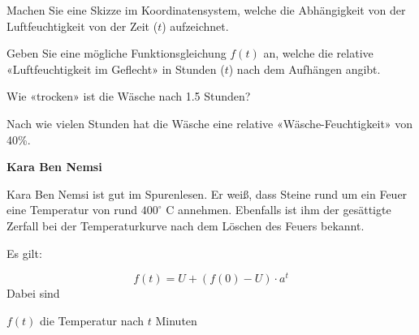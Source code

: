 \begin{bbwAufgabenBlock}
\item Machen Sie eine Skizze im Koordinatensystem, welche die
Abhängigkeit von der Luftfeuchtigkeit von der Zeit ($t$) aufzeichnet.


\item Geben Sie eine mögliche Funktionsgleichung $f(t)$ an, welche die relative
«Luftfeuchtigkeit im Geflecht» in Stunden ($t$) nach dem Aufhängen
angibt.


\item Wie «trocken» ist die Wäsche nach 1.5 Stunden?


\item Nach wie vielen Stunden hat die Wäsche eine relative
«Wäsche-Feuchtigkeit» von 40\%.


\TRAINER{

$$f(t) = 35 + 60 \cdot \left( \frac{19}{60}\right)^t$$
$f(t) = 40[\%]$ einsetzen:

$$40 [\%| = 35 + 60 \cdot \left( \frac{19}{60}\right)^t$$
$$5 [\%| = 60 \cdot \left( \frac{19}{60}\right)^t$$
$$\frac5{60} [\%| =\left( \frac{19}{60}\right)^t$$
$$t = \log_{\frac{19}{60}}(\frac5{60}) \approx 2.16 [\textrm{h}]$$
}%

\end{bbwAufgabenBlock}


\platzFuerBerechnungenBisEndeSeite{}



\bbwActAufgabenNr{} \textbf{Kara Ben Nemsi}
\nextBbwAufgabenNummer{}

Kara Ben Nemsi ist gut im Spurenlesen. Er weiß, dass Steine rund um ein Feuer eine Temperatur von rund $400^\circ$ C annehmen.
Ebenfalls ist ihm der gesättigte Zerfall bei der Temperaturkurve nach dem Löschen des Feuers bekannt.

Es gilt:

$$f(t) = U + \left(f(0) - U\right) \cdot{} a^t$$
Dabei sind

$f(t)$ die Temperatur nach $t$ Minuten

